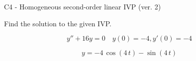 \begin{exercise}
  \begin{exerciseTitle}C4 - Homogeneous second-order linear IVP (ver. 2)\end{exerciseTitle}
  \begin{exerciseStatement}
    
Find the solution to the given IVP.

    
\[y''+16y = 0 \hspace{1em} y(0) = -4 , y'(0) = -4\]

  \end{exerciseStatement}
  \begin{exerciseAnswer}
    
\[y= -4 \, \cos\left(4 \, t\right) - \sin\left(4 \, t\right)\]

  \end{exerciseAnswer}
\end{exercise}